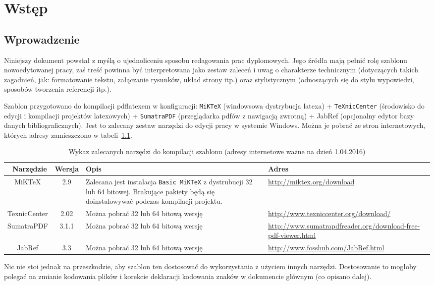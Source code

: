 \chapter{Wstęp}
\section{Wprowadzenie}
Niniejszy dokument powstał z myślą o ujednoliceniu sposobu redagowania prac dyplomowych. Jego źródła mają pełnić rolę szablonu nowoedytowanej pracy, zaś treść powinna być interpretowana jako zestaw zaleceń i uwag o charakterze technicznym (dotyczących takich zagadnień, jak: formatowanie tekstu, załączanie rysunków, układ strony itp.) oraz stylistycznym (odnoszących się do stylu wypowiedzi, sposobów tworzenia referencji itp.).

Szablon przygotowano do kompilacji pdflatexem w konfiguracji: \texttt{MiKTeX} (windowsowa dystrybucja latexa) + \texttt{TeXnicCenter} (środowisko do edycji i kompilacji projektów latexowych) + \texttt{SumatraPDF} (przeglądarka pdfów z nawigacją zwrotną) + JabRef (opcjonalny edytor bazy danych bibliograficznych). Jest to zalecany zestaw narzędzi do edycji pracy w systemie Windows. Można je pobrać ze stron internetowych, których adresy zamieszczono w tabeli~\ref{tab:narzedzia}.
\begin{table}[htb] \small
\centering
\caption{Wykaz zalecanych narzędzi do kompilacji szablonu (adresy internetowe ważne na dzień 1.04.2016)}
\label{tab:narzedzia}
\begin{tabularx}{\linewidth}{|c|c|X|p{6cm}|} \hline\
Narzędzie & Wersja & Opis & Adres \\ \hline\hline
MiKTeX & 2.9 & Zalecana jest instalacja \texttt{Basic MiKTeX} z dystrubucji 32 lub 64 bitowej. Brakujące pakiety będą się doinstalowywać podczas kompilacji projektu. &
\url{http://miktex.org/download} \\ \hline
TexnicCenter & 2.02 &  Można pobrać 32 lub 64 bitową wersję & \url{http://www.texniccenter.org/download/} \\ \hline
SumatraPDF & 3.1.1 & Można pobrać 32 lub 64 bitową wersję & \url{http://www.sumatrapdfreader.org/download-free-pdf-viewer.html} \\ \hline
JabRef & 3.3 & Można pobrać 32 lub 64 bitową wersję & \url{http://www.fosshub.com/JabRef.html} \\ \hline
\end{tabularx}
\end{table}
Nic nie stoi jednak na przeszkodzie, aby szablon ten dostosować do wykorzystania z użyciem innych narzędzi. Dostosowanie to mogłoby polegać na zmianie kodowania plików i korekcie deklaracji kodowania znaków w dokumencie głównym (co opisano dalej).


